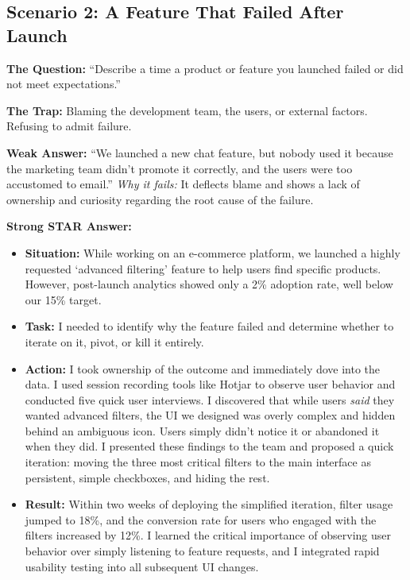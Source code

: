 \subsection{Scenario 2: A Feature That Failed After
Launch}\label{scenario-2-a-feature-that-failed-after-launch}

\textbf{The Question:} ``Describe a time a product or feature you
launched failed or did not meet expectations.''

\textbf{The Trap:} Blaming the development team, the users, or external
factors. Refusing to admit failure.

\textbf{Weak Answer:} ``We launched a new chat feature, but nobody used
it because the marketing team didn't promote it correctly, and the users
were too accustomed to email.'' \emph{Why it fails:} It deflects blame
and shows a lack of ownership and curiosity regarding the root cause of
the failure.

\textbf{Strong STAR Answer:}

\begin{itemize}
\tightlist
\item
  \textbf{Situation:} While working on an e-commerce platform, we
  launched a highly requested `advanced filtering' feature to help users
  find specific products. However, post-launch analytics showed only a
  2\% adoption rate, well below our 15\% target.
\item
  \textbf{Task:} I needed to identify why the feature failed and
  determine whether to iterate on it, pivot, or kill it entirely.
\item
  \textbf{Action:} I took ownership of the outcome and immediately dove
  into the data. I used session recording tools like Hotjar to observe
  user behavior and conducted five quick user interviews. I discovered
  that while users \emph{said} they wanted advanced filters, the UI we
  designed was overly complex and hidden behind an ambiguous icon. Users
  simply didn't notice it or abandoned it when they did. I presented
  these findings to the team and proposed a quick iteration: moving the
  three most critical filters to the main interface as persistent,
  simple checkboxes, and hiding the rest.
\item
  \textbf{Result:} Within two weeks of deploying the simplified
  iteration, filter usage jumped to 18\%, and the conversion rate for
  users who engaged with the filters increased by 12\%. I learned the
  critical importance of observing user behavior over simply listening
  to feature requests, and I integrated rapid usability testing into all
  subsequent UI changes.
\end{itemize}


